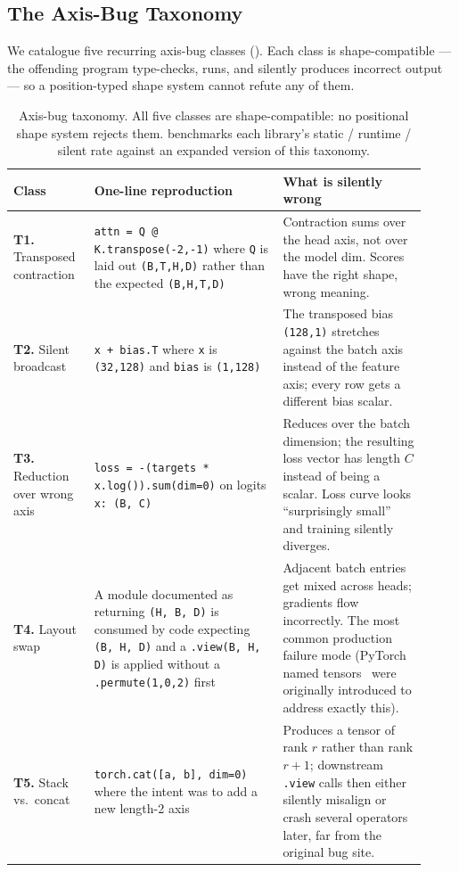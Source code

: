 \documentclass[10pt,twocolumn]{article}
\newcommand{\code}[1]{\texttt{#1}}
\begin{document}
\subsection{The Axis-Bug Taxonomy}
\label{sec:bg-taxonomy}

We catalogue five recurring axis-bug classes ().
Each class is shape-compatible --- the offending program type-checks,
runs, and silently produces incorrect output --- so a position-typed
shape system cannot refute any of them.

\begin{table}[t]
\centering\small
\begin{tabular}{@{}p{0.18\linewidth} p{0.42\linewidth} p{0.32\linewidth}@{}}
\toprule
\textbf{Class} & \textbf{One-line reproduction} & \textbf{What is silently wrong} \\
\midrule
\textbf{T1.} Transposed contraction &
\code{attn = Q @ K.transpose(-2,-1)} where \code{Q} is laid out
\code{(B,T,H,D)} rather than the expected \code{(B,H,T,D)} &
Contraction sums over the head axis, not over the model dim.
Scores have the right shape, wrong meaning. \\
\addlinespace[2pt]
\textbf{T2.} Silent broadcast &
\code{x + bias.T} where \code{x} is \code{(32,128)} and \code{bias}
is \code{(1,128)} &
The transposed bias \code{(128,1)} stretches against the batch axis
instead of the feature axis; every row gets a different bias scalar. \\
\addlinespace[2pt]
\textbf{T3.} Reduction over wrong axis &
\code{loss = -(targets * x.log()).sum(dim=0)} on logits
\code{x: (B, C)} &
Reduces over the batch dimension; the resulting loss vector has
length $C$ instead of being a scalar. Loss curve looks
``surprisingly small'' and training silently diverges. \\
\addlinespace[2pt]
\textbf{T4.} Layout swap &
A module documented as returning \code{(H, B, D)} is consumed by code
expecting \code{(B, H, D)} and a \code{.view(B, H, D)} is applied
without a \code{.permute(1,0,2)} first &
Adjacent batch entries get mixed across heads; gradients flow
incorrectly. The most common production failure mode (PyTorch named
tensors~\cite{pytorch-named-tensors} were originally introduced to
address exactly this). \\
\addlinespace[2pt]
\textbf{T5.} Stack vs.\ concat &
\code{torch.cat([a, b], dim=0)} where the intent was to add a new
length-2 axis &
Produces a tensor of rank $r$ rather than rank $r{+}1$; downstream
\code{.view} calls then either silently misalign or crash several
operators later, far from the original bug site. \\
\bottomrule
\end{tabular}
\caption{Axis-bug taxonomy. All five classes are shape-compatible:
no positional shape system rejects them. 
benchmarks each library's static / runtime / silent rate against an
expanded version of this taxonomy.}
\label{tab:axis-bugs}
\end{table}
\end{document}
